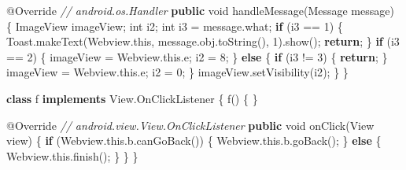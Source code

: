 \documentclass[
]{article}
\newenvironment{Shaded}{}{}
\newcommand{\AttributeTok}[1]{\textcolor[rgb]{0.49,0.56,0.16}{#1}}
\newcommand{\BuiltInTok}[1]{\textcolor[rgb]{0.00,0.50,0.00}{#1}}
\newcommand{\CommentTok}[1]{\textcolor[rgb]{0.38,0.63,0.69}{\textit{#1}}}
\newcommand{\ControlFlowTok}[1]{\textcolor[rgb]{0.00,0.44,0.13}{\textbf{#1}}}
\newcommand{\DataTypeTok}[1]{\textcolor[rgb]{0.56,0.13,0.00}{#1}}
\newcommand{\DecValTok}[1]{\textcolor[rgb]{0.25,0.63,0.44}{#1}}
\newcommand{\FunctionTok}[1]{\textcolor[rgb]{0.02,0.16,0.49}{#1}}
\newcommand{\KeywordTok}[1]{\textcolor[rgb]{0.00,0.44,0.13}{\textbf{#1}}}
\newcommand{\NormalTok}[1]{#1}
\newcommand{\OperatorTok}[1]{\textcolor[rgb]{0.40,0.40,0.40}{#1}}
\begin{document}
\begin{Shaded}
\begin{Highlighting}[]
        \AttributeTok{@Override} \CommentTok{// android.os.Handler}
        \KeywordTok{public} \DataTypeTok{void} \FunctionTok{handleMessage}\OperatorTok{(}\NormalTok{Message message}\OperatorTok{)} \OperatorTok{\{}
            \BuiltInTok{ImageView}\NormalTok{ imageView}\OperatorTok{;}
            \DataTypeTok{int}\NormalTok{ i2}\OperatorTok{;}
            \DataTypeTok{int}\NormalTok{ i3 }\OperatorTok{=}\NormalTok{ message}\OperatorTok{.}\FunctionTok{what}\OperatorTok{;}
            \ControlFlowTok{if} \OperatorTok{(}\NormalTok{i3 }\OperatorTok{==} \DecValTok{1}\OperatorTok{)} \OperatorTok{\{}
\NormalTok{                Toast}\OperatorTok{.}\FunctionTok{makeText}\OperatorTok{(}\NormalTok{Webview}\OperatorTok{.}\FunctionTok{this}\OperatorTok{,}\NormalTok{ message}\OperatorTok{.}\FunctionTok{obj}\OperatorTok{.}\FunctionTok{toString}\OperatorTok{(),} \DecValTok{1}\OperatorTok{).}\FunctionTok{show}\OperatorTok{();}
                \ControlFlowTok{return}\OperatorTok{;}
            \OperatorTok{\}}
            \ControlFlowTok{if} \OperatorTok{(}\NormalTok{i3 }\OperatorTok{==} \DecValTok{2}\OperatorTok{)} \OperatorTok{\{}
\NormalTok{                imageView }\OperatorTok{=}\NormalTok{ Webview}\OperatorTok{.}\FunctionTok{this}\OperatorTok{.}\FunctionTok{e}\OperatorTok{;}
\NormalTok{                i2 }\OperatorTok{=} \DecValTok{8}\OperatorTok{;}
            \OperatorTok{\}} \ControlFlowTok{else} \OperatorTok{\{}
                \ControlFlowTok{if} \OperatorTok{(}\NormalTok{i3 }\OperatorTok{!=} \DecValTok{3}\OperatorTok{)} \OperatorTok{\{}
                    \ControlFlowTok{return}\OperatorTok{;}
                \OperatorTok{\}}
\NormalTok{                imageView }\OperatorTok{=}\NormalTok{ Webview}\OperatorTok{.}\FunctionTok{this}\OperatorTok{.}\FunctionTok{e}\OperatorTok{;}
\NormalTok{                i2 }\OperatorTok{=} \DecValTok{0}\OperatorTok{;}
            \OperatorTok{\}}
\NormalTok{            imageView}\OperatorTok{.}\FunctionTok{setVisibility}\OperatorTok{(}\NormalTok{i2}\OperatorTok{);}
        \OperatorTok{\}}
    \OperatorTok{\}}

    \KeywordTok{class}\NormalTok{ f }\KeywordTok{implements} \BuiltInTok{View}\OperatorTok{.}\FunctionTok{OnClickListener} \OperatorTok{\{}
        \FunctionTok{f}\OperatorTok{()} \OperatorTok{\{}
        \OperatorTok{\}}

        \AttributeTok{@Override} \CommentTok{// android.view.View.OnClickListener}
        \KeywordTok{public} \DataTypeTok{void} \FunctionTok{onClick}\OperatorTok{(}\BuiltInTok{View}\NormalTok{ view}\OperatorTok{)} \OperatorTok{\{}
            \ControlFlowTok{if} \OperatorTok{(}\NormalTok{Webview}\OperatorTok{.}\FunctionTok{this}\OperatorTok{.}\FunctionTok{b}\OperatorTok{.}\FunctionTok{canGoBack}\OperatorTok{())} \OperatorTok{\{}
\NormalTok{                Webview}\OperatorTok{.}\FunctionTok{this}\OperatorTok{.}\FunctionTok{b}\OperatorTok{.}\FunctionTok{goBack}\OperatorTok{();}
            \OperatorTok{\}} \ControlFlowTok{else} \OperatorTok{\{}
\NormalTok{                Webview}\OperatorTok{.}\FunctionTok{this}\OperatorTok{.}\FunctionTok{finish}\OperatorTok{();}
            \OperatorTok{\}}
        \OperatorTok{\}}
    \OperatorTok{\}}


\end{Highlighting}
\end{Shaded}
\end{document}
